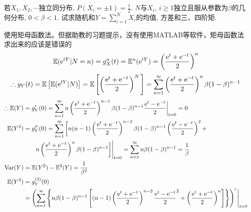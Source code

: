 \begin{problem}{1.16}
若$X_1, X_2, \cdots$独立同分布, $P(X_i = \pm 1) = \frac{1}{2}$. $N$与$X_i$, $i \geqslant 1$独立且服从参数为$\beta$的几何分布, $0 < \beta < 1$. 试求随机和$Y = \sum\limits^N_{i=1} X_i$的均值, 方差和三、四阶矩.
\end{problem}
\begin{solution}[1]
	使用矩母函数法。但据助教的习题提示，没有使用MATLAB等软件，矩母函数法求出来的应该是错误的\cite{郑班助教}
	\[\mathbb{E}(\mathrm{e}^{tY}|N = n) = g^n_X (t) = \mathbb{E}^n(\mathrm{e}^{tY}) = {\left(\frac{\mathrm{e}^t + \mathrm{e}^{-t}}{2}\right)}^n\]
	\[\therefore g_Y(t) = \mathbb{E}\left[\mathbb{E}(\mathrm{e}^{tY}|N)\right] = \mathbb{E}\left[\left(\frac{\mathrm{e}^t + \mathrm{e}^{-t}}{2}\right)^N\,\right] = \sum^{\infty}_{n=1}\left(\frac{\mathrm{e}^t + \mathrm{e}^{-t}}{2}\right)^n \beta (1 - \beta)^{n - 1}\]
	\[\begin{aligned}
			\therefore \E(Y) & = g'_Y(0) = \sum^{\infty}_{n=1} n \left(\frac{\e^t + \e^{-t}}{2}\right)^{n - 1}\beta (1 - \beta)^{n - 1} \frac{\e^t - \e^{-t}}{2} \bigg|_{t=0} = 0                                                                                   \\
			\E(Y^2)          & = g''_Y(0) = \sum^{\infty}_{n=1}\bigg[ n(n-1)\left(\frac{\e^t + \e^{-t}}{2}\right)^{n-2}\beta (1 - \beta)^{n - 1} \left(\frac{\e^t - \e^{-t}}{2}\right)^2 +                                                                          \\
			                 & \qquad n\left(\frac{\e^t + \e^{-t}}{2}\right)^n\beta (1 - \beta)^{n - 1} \bigg] \Bigg|_{t=0} = \sum^{\infty}_{n=1}n\beta(1-\beta)^{n-1} = \frac{1}{\beta}                                                                            \\
			\var(Y)          & = \E(Y^2)-\E^2(Y) = \frac{1}{{\beta}^2}                                                                                                                                                                                              \\
			\E(Y^3)          & = g^{(3)}_Y(0)                                                                                                                                                                                                                       \\
			                 & = \left(\sum^{\infty}_{n=1}\left\{n\beta(1-\beta)^{n-1}\left[(n-1)\left(\frac{\e^t+\e^{-t}}{2}\right)^{n-2}{\frac{\e^t-\e^{-t}}{2}}^2+\left(\frac{\e^t+\e^{-t}}{2}\right)^n\right]\right\}\right)'\Bigg|_{t=0}                       \\

\end{aligned}\]
\end{solution}
